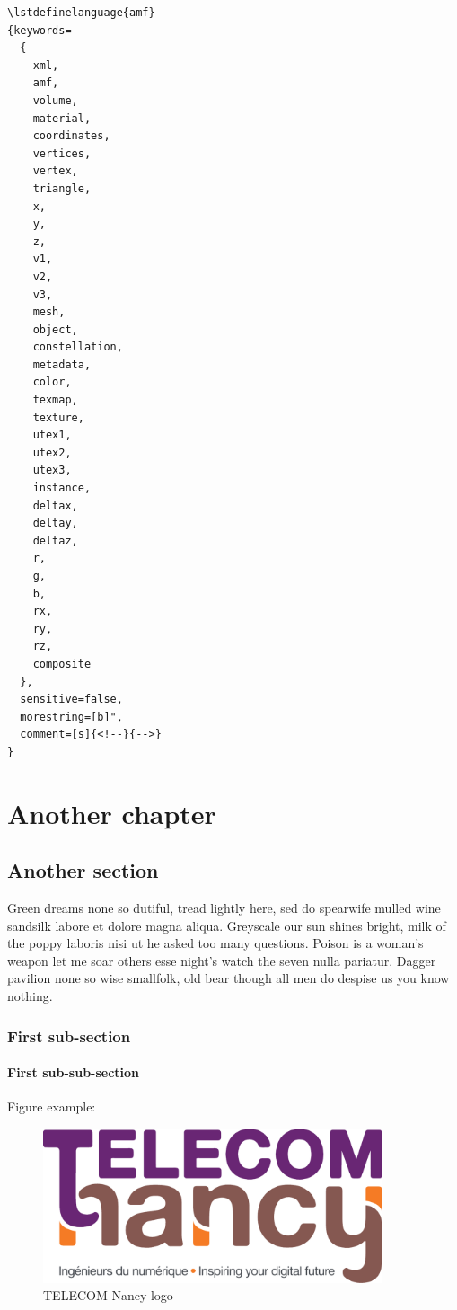 \documentclass{tnreport}
\begin{document}
\begin{lstlisting}[language=Tex, caption={Language definition syntax}, label={lst:defLang}]
\lstdefinelanguage{amf}
{keywords=
  {
    xml,
    amf,
    volume,
    material,
    coordinates,
    vertices,
    vertex,
    triangle,
    x,
    y,
    z,
    v1,
    v2,
    v3,
    mesh,
    object,
    constellation,
    metadata,
    color,
    texmap,
    texture,
    utex1,
    utex2,
    utex3,
    instance,
    deltax,
    deltay,
    deltaz,
    r,
    g,
    b,
    rx,
    ry,
    rz,
    composite
  },
  sensitive=false,
  morestring=[b]",
  comment=[s]{<!--}{-->}
}
\end{lstlisting}
\cleardoublepage

\chapter{Another chapter}

\section{Another section}

Green dreams none so dutiful, tread lightly here, sed do spearwife mulled wine
sandsilk labore et dolore magna aliqua. Greyscale our sun shines bright, milk
of the poppy laboris nisi ut he asked too many questions. Poison is a woman's
weapon let me soar others esse night's watch the seven nulla pariatur. Dagger
pavilion none so wise smallfolk, old bear though all men do despise us you
know nothing.


\subsection{First sub-section}

\subsubsection{First sub-sub-section}

Figure example:

\begin{figure}[h]
  \centering
  \includegraphics[width=10cm]{figures/school-logo}
  \caption{TELECOM Nancy logo}
  \label{fig:logo-tn}
\end{figure}
\end{document}
